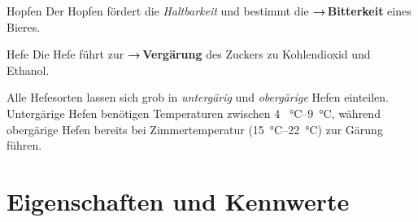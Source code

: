 \documentclass[9pt, ngerman]{beamer}
\newcommand{\forward}[1]{\textbf{→\,#1}}
\begin{document}
\begin{frame}{Hopfen}
  Der Hopfen fördert die \emph{Haltbarkeit} und bestimmt die
  \forward{Bitterkeit} eines Bieres.
\end{frame}
\begin{frame}{Hefe}
  Die Hefe führt zur \forward{Vergärung} des Zuckers zu Kohlendioxid und
  Ethanol.

  Alle Hefesorten lassen sich grob in \emph{untergärig} und \emph{obergärige}
  Hefen einteilen. Untergärige Hefen benötigen Temperaturen zwischen \SIrange{4
  }{9}{\celsius}, während obergärige Hefen bereits bei Zimmertemperatur (\SIrange{15}{22}{\celsius}) zur
  Gärung führen.
\end{frame}

\section{Eigenschaften und Kennwerte}
\end{document}
